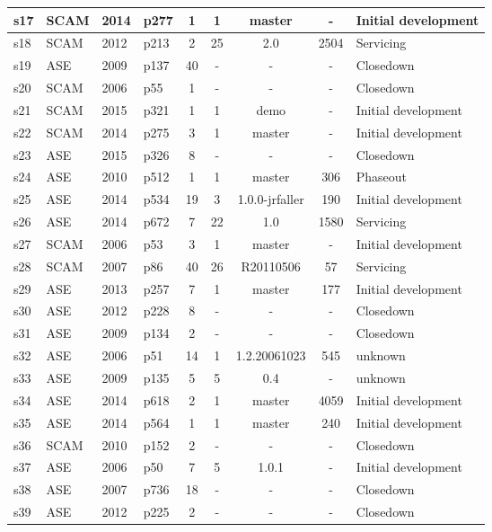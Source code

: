 \begin{longtable}{| l | l | l | l | c | c | c | c | l |}
    \hline
s17 & SCAM & 2014 & p277 & 1 & 1 & master & - & Initial development \\
    \hline
s18 & SCAM & 2012 & p213 & 2 & 25 & 2.0 & 2504 & Servicing \\
    \hline
s19 & ASE & 2009 & p137 & 40 & - & - & - & Closedown \\
    \hline
s20 & SCAM & 2006 & p55 & 1 & - & - & - & Closedown \\
    \hline
s21 & SCAM & 2015 & p321 & 1 & 1 & demo & - & Initial development \\
    \hline
s22 & SCAM & 2014 & p275 & 3 & 1 & master & - & Initial development \\
    \hline
s23 & ASE & 2015 & p326 & 8 & - & - & - & Closedown \\
    \hline
s24 & ASE & 2010 & p512 & 1 & 1 & master & 306 & Phaseout \\
    \hline
s25 & ASE & 2014 & p534 & 19 & 3 & 1.0.0-jrfaller & 190 & Initial development \\
    \hline
s26 & ASE & 2014 & p672 & 7 & 22 & 1.0 & 1580 & Servicing \\
    \hline
s27 & SCAM & 2006 & p53 & 3 & 1 & master & - & Initial development \\
    \hline
s28 & SCAM & 2007 & p86 & 40 & 26 & R20110506 & 57 & Servicing \\
    \hline
s29 & ASE & 2013 & p257 & 7 & 1 & master & 177 & Initial development \\
    \hline
s30 & ASE & 2012 & p228 & 8 & - & - & - & Closedown \\
    \hline
s31 & ASE & 2009 & p134 & 2 & - & - & - & Closedown \\
    \hline
s32 & ASE & 2006 & p51 & 14 & 1 & 1.2.20061023 & 545 & unknown \\
    \hline
s33 & ASE & 2009 & p135 & 5 & 5 & 0.4 & - & unknown \\
    \hline
s34 & ASE & 2014 & p618 & 2 & 1 & master & 4059 & Initial development \\
    \hline
s35 & ASE & 2014 & p564 & 1 & 1 & master & 240 & Initial development \\
    \hline
s36 & SCAM & 2010 & p152 & 2 & - & - & - & Closedown \\
    \hline
s37 & ASE & 2006 & p50 & 7 & 5 & 1.0.1 & - & Initial development \\
    \hline
s38 & ASE & 2007 & p736 & 18 & - & - & - & Closedown \\
    \hline
s39 & ASE & 2012 & p225 & 2 & - & - & - & Closedown \\

\end{longtable}
